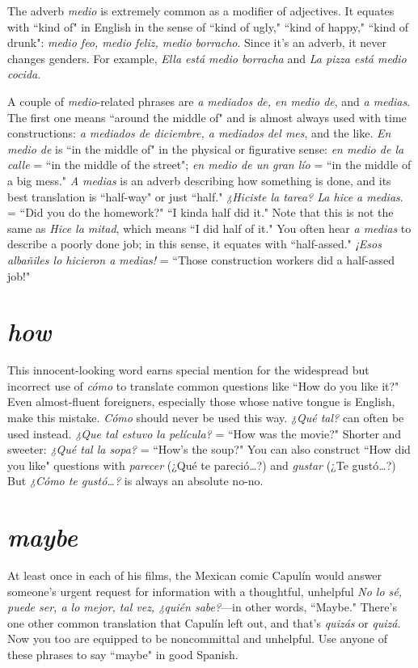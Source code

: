 The adverb \emph{medio} is extremely common as a modifier of adjectives. It equates with ``kind of" in English in the sense of ``kind of
ugly," ``kind of happy," ``kind of drunk": \emph{medio feo, medio feliz, medio
borracho}. Since it's an adverb, it never changes genders. For example,
\emph{Ella está medio borracha} and \emph{La pizza está medio cocida}.

A couple of \emph{medio}-related phrases are \emph{a mediados de, en medio de}, and \emph{a medias}. The first one means ``around the middle of"
and is almost always used with time constructions: \emph{a mediados de diciembre, a mediados del mes}, and the like. \emph{En medio de} is ``in the
middle of" in the physical or figurative sense: \emph{en medio de la calle}
= ``in the middle of the street"; \emph{en medio de un gran lío} = ``in the
middle of a big mess." \emph{A medias} is an adverb describing how something is done, and its best translation is ``half-way" or just ``half." \emph{¿Hiciste la tarea? La hice a medias}. = ``Did you do the homework?" ``I
kinda half did it." Note that this is not the same as \emph{Hice la mitad},
which means ``I did half of it." You often hear \emph{a medias} to describe a
poorly done job; in this sense, it equates with ``half-assed." \emph{¡Esos albañiles lo hicieron a medias!} = ``Those construction workers did a
half-assed job!"

\section{\emph{how}}

This innocent-looking word earns special mention for the
widespread but incorrect use of \emph{cómo} to translate common questions
like ``How do you like it?" Even almost-fluent foreigners, especially
those whose native tongue is English, make this mistake. \emph{Cómo}
should never be used this way. \emph{¿Qué tal?} can often be used instead.
\emph{¿Que tal estuvo la película?} = ``How was the movie?" Shorter and
sweeter: \emph{¿Qué tal la sopa?} = ``How's the soup?" You can also construct ``How did you like" questions with \emph{parecer} (¿Qué te pareció\ldots{}?) and \emph{gustar} (¿Te gustó\ldots{}?) But \emph{¿Cómo te gustó\ldots{}?}
is always an absolute no-no.

\section{\emph{maybe}}

At least once in each of his films, the Mexican comic Capulín would answer someone's urgent request for information with a
thoughtful, unhelpful \emph{No lo sé, puede ser, a lo mejor, tal vez, ¿quién
sabe?}---in other words, ``Maybe." There's one other common translation that Capulín left out, and that's \emph{quizás} or \emph{quizá}. Now you too
are equipped to be noncommittal and unhelpful. Use anyone of these
phrases to say ``maybe" in good Spanish.

